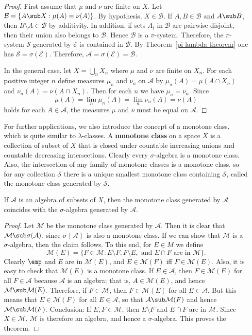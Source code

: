\begin{proof}
First assume that $\mu$ and $\nu$ are finite on $X$. Let $\mathcal{B}=\{A\sub X:\mu(A)=\nu(A)\}$. By hypothesis, $X\in\mathcal{B}$. If $A,B\in\mathcal{B}$ and $A\sub B$, then $B\setminus A\in\mathcal{B}$ by additivity. In addition, if sets $A_i$ in $\mathcal{B}$ are pairwise disjoint, then their union also belongs to $\mathcal{B}$. Hence $\mathcal{B}$ is a $\pi$-system. Therefore, the $\pi$-system $\mathcal{S}$ generated by $\mathcal{E}$ is contained in $\mathcal{B}$. By Theorem~\ref{pi-lambda theorem} one has $\mathcal{S}=\sigma(\mathcal{E})$. Therefore, $\mathcal{A}=\sigma(\mathcal{E})=\mathcal{B}$.\par
In the general case, let $X=\bigcup_{n}X_n$ where $\mu$ and $\nu$ are finite on $X_n$. For each positive integer $n$ define measures $\mu_n$ and $\nu_n$ on $\mathcal{A}$ by $\mu_n(A)=\mu(A\cap X_n)$ and $\nu_n(A)=\nu(A\cap X_n)$. Then for each $n$ we have $\mu_n=\nu_n$. Since 
\[\mu(A)=\lim_n\mu_n(A)=\lim_n\nu_n(A)=\nu(A)\]
holds for each $A\in\mathcal{A}$, the measures $\mu$ and $\nu$ must be equal on $\mathcal{A}$.
\end{proof}
For further applications, we also introduce the concept of a monotone class, which is quite similar to $\lambda$-classes. A \textbf{monotone class} on a space $X$ is a collection of subset of $X$ that is closed under countable increasing unions and countable decreasing intersections. Clearly every $\sigma$-algebra is a monotone class. Also, the intersection of any family of monotone classes is a monotone class, so for any collection $\mathcal{S}$ there is a unique smallest monotone class containing $\mathcal{S}$, called the monotone class generated by $\mathcal{S}$.
\begin{theorem}
If $\mathcal{A}$ is an algebra of subsets of $X$, then the monotone class generated by $\mathcal{A}$ coincides with the $\sigma$-algebra generated by $\mathcal{A}$.
\end{theorem}
\begin{proof}
Let $\mathcal{M}$ be the monotone class generated by $\mathcal{A}$. Then it is clear that $\mathcal{M}\sub\sigma(\mathcal{A})$, since $\sigma(\mathcal{A})$ is also a monotone class. If we can show that $\mathcal{M}$ is a $\sigma$-algebra, then the claim follows. To this end, for $E\in{M}$ we define
\[\mathcal{M}(E)=\{F\in\mathcal{M}:E\setminus F,F\setminus E,\text{ and $E\cap F$ are in $\mathcal{M}$}\}.\]
Clearly $\emp$ and $E$ are in $\mathcal{M}(E)$, and $E\in\mathcal{M}(F)$ iff $F\in\mathcal{M}(E)$. Also, it is easy to check that $\mathcal{M}(E)$ is a monotone class. If $E\in\mathcal{A}$, then $F\in\mathcal{M}(E)$ for all $F\in\mathcal{A}$ because $\mathcal{A}$ is an algebra; that is, $A\in\mathcal{M}(E)$, and hence $\mathcal{M}\sub\mathcal{M}(E)$. Therefore, if $F\in\mathcal{M}$, then $F\in\mathcal{M}(E)$ for all $E\in\mathcal{A}$. But this means that $E\in\mathcal{M}(F)$ for all $E\in\mathcal{A}$, so that $\mathcal{A}\sub\mathcal{M}(F)$ and hence $\mathcal{M}\sub\mathcal{M}(F)$. Conclusion: If $E,F\in\mathcal{M}$, then $E\setminus F$ and $E\cap F$ are in $\mathcal{M}$. Since $X\in\mathcal{M}$, $\mathcal{M}$ is therefore an algebra, and hence a $\sigma$-algebra. This proves the theorem.
\end{proof}
